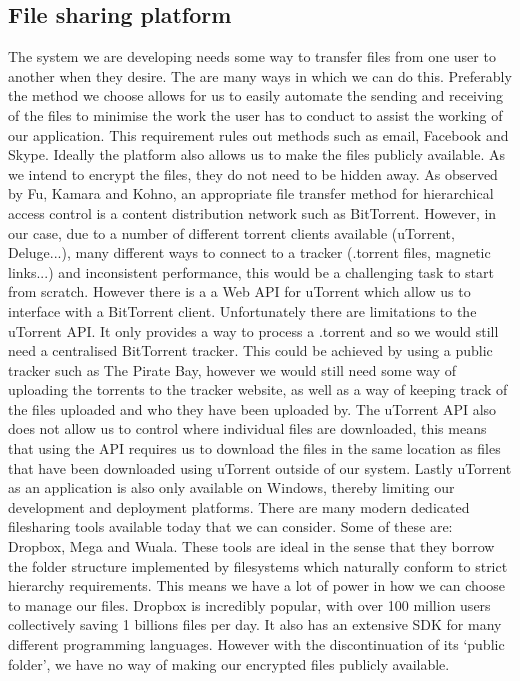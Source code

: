 \documentclass[12pt, titlepage]{article}
\begin{document}
\subsection{File sharing platform}
The system we are developing needs some way to transfer files from one user to another when they desire. The are many ways in which we can do this. Preferably the method we choose allows for us to easily automate the sending and receiving of the files to minimise the work the user has to conduct to assist the working of our application. This requirement rules out methods such as email, Facebook and Skype. Ideally the platform also allows us to make the files publicly available. As we intend to encrypt the files, they do not need to be hidden away.
\newline \indent As observed by Fu, Kamara and Kohno, an appropriate file transfer method for hierarchical access control is a content distribution network such as BitTorrent.\cite{bittorrent} However, in our case, due to a number of different torrent clients available (uTorrent, Deluge...), many different ways to connect to a tracker (.torrent files, magnetic links...) and inconsistent performance, this would be a challenging task to start from scratch. However there is a a Web API for uTorrent which allow us to interface with a BitTorrent client.\cite{uTorrentAPI} Unfortunately there are limitations to the uTorrent API. It only provides a way to process a .torrent and so we would still need a centralised BitTorrent tracker. This could be achieved by using a public tracker such as The Pirate Bay, however we would still need some way of uploading the torrents to the tracker website, as well as a way of keeping track of the files uploaded and who they have been uploaded by. The uTorrent API also does not allow  us to control where individual files are downloaded, this means that using the API requires us to download the files in the same location as files that have been downloaded using uTorrent outside of our system. Lastly uTorrent as an application is also only available on Windows, thereby limiting our development and deployment platforms.
\newline \indent There are many modern dedicated filesharing tools available today that we can consider. Some of these are: Dropbox, Mega and Wuala. These tools are ideal in the sense that they borrow the folder structure implemented by filesystems which naturally conform to strict hierarchy requirements. This means we have a lot of power in how we can choose to manage our files. Dropbox is incredibly popular, with over 100 million users collectively saving 1 billions files per day.\cite{dropboxInfo} It also has an extensive SDK for many different programming languages. However with the discontinuation of its `public folder'\cite{dropboxPublicFolder}, we have no way of making our encrypted files publicly available.
\end{document}
